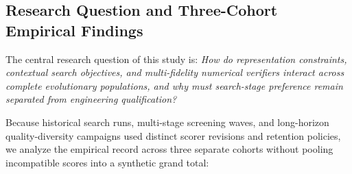 \subsection{Research Question and Three-Cohort Empirical Findings}
\label{subsec:research-question-and-results}
The central research question of this study is: \emph{How do representation constraints, contextual search objectives, and multi-fidelity numerical verifiers interact across complete evolutionary populations, and why must search-stage preference remain separated from engineering qualification?}

Because historical search runs, multi-stage screening waves, and long-horizon quality-diversity campaigns used distinct scorer revisions and retention policies, we analyze the empirical record across three separate cohorts without pooling incompatible scores into a synthetic grand total:
